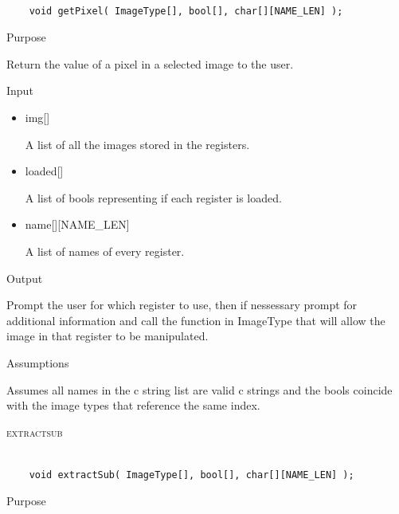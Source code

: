 \documentclass[pdftex, 11pt]{article}
\begin{document}
\begin{description}
		\begin{lstlisting}

	void getPixel( ImageType[], bool[], char[][NAME_LEN] );
		\end{lstlisting}

		\begin{description}
			\item{Purpose}

				Return the value of a pixel in a selected image to the user.

			\item{Input}

				\begin{itemize}

					\item{img[]}

						A list of all the images stored in the registers.

					\item{loaded[]}

						A list of bools representing if each register is loaded.

					\item{name[][NAME\_LEN]}

						A list of names of every register.

				\end{itemize}

			\item{Output}

				Prompt the user for which register to use, then if nessessary
				prompt for additional information and call the function
				in ImageType that will allow the image in that register to
				be manipulated.

			\item{Assumptions}

				Assumes all names in the c string list are valid c
				strings and the bools coincide with the image types that
				reference the same index.

		\end{description}



	\item{\textsc{extractsub}}

		\begin{lstlisting}

	void extractSub( ImageType[], bool[], char[][NAME_LEN] );
		\end{lstlisting}

		\begin{description}
			\item{Purpose}


\end{description}
\end{description}
\end{document}
